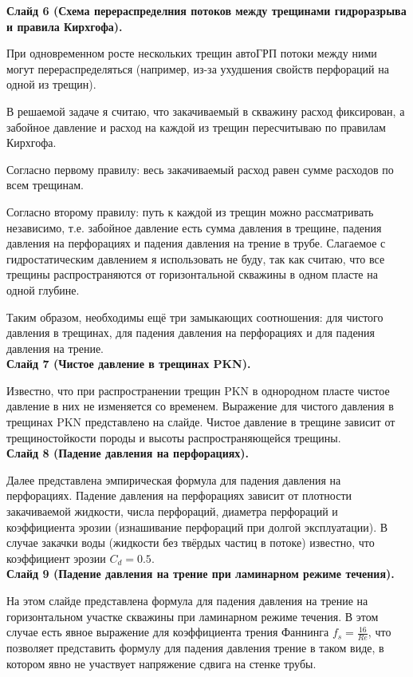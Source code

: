 \documentclass[a4paper, 12pt]{article}
\begin{document}
\textbf{Слайд 6 (Схема перераспределния потоков между трещинами гидроразрыва и правила Кирхгофа).}

При одновременном росте нескольких трещин автоГРП потоки между ними могут перераспределяться (например, из-за ухудшения свойств перфораций на одной из трещин).

В решаемой задаче я считаю, что закачиваемый в скважину расход фиксирован, а забойное давление и расход на каждой из трещин пересчитываю по правилам Кирхгофа.

Согласно первому правилу: весь закачиваемый расход равен сумме расходов по всем трещинам.

Согласно второму правилу: путь к каждой из трещин можно рассматривать независимо, т.е. забойное давление есть сумма давления в трещине, падения давления на перфорациях и падения давления на трение в трубе.
Слагаемое с гидростатическим давлением я использовать не буду, так как считаю, что все трещины распространяются от горизонтальной скважины в одном пласте на одной глубине.

Таким образом, необходимы ещё три замыкающих соотношения: для чистого давления в трещинах, для падения давления на перфорациях и для падения давления на трение.
\\

\textbf{Слайд 7 (Чистое давление в трещинах PKN).}

Известно, что при распространении трещин PKN в однородном пласте чистое давление в них не изменяется со временем.
Выражение для чистого давления в трещинах PKN представлено на слайде. Чистое давление в трещине зависит от трещиностойкости породы и высоты распространяющейся трещины.
\\

\textbf{Слайд 8 (Падение давления на перфорациях).}

Далее представлена эмпирическая формула для падения давления на перфорациях.
Падение давления на перфорациях зависит от плотности закачиваемой жидкости, числа перфораций, диаметра перфораций и коэффициента эрозии (изнашивание перфораций при долгой эксплуатации).
В случае закачки воды (жидкости без твёрдых частиц в потоке) известно, что коэффициент эрозии $C_d=0.5$.
\\

\textbf{Слайд 9 (Падение давления на трение при ламинарном режиме течения).}

На этом слайде представлена формула для падения давления на трение на горизонтальном участке скважины при ламинарном режиме течения.
В этом случае есть явное выражение для коэффициента трения Фаннинга $f_s=\frac{16}{Re}$, что позволяет представить формулу для падения давления трение в таком виде, в котором явно не участвует напряжение сдвига на стенке трубы.
\\
\end{document}
